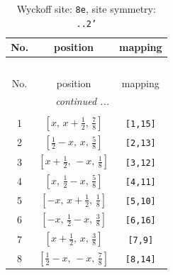 \documentclass[fleqn,8pt]{jsarticle}
\begin{document}
\begin{longtable}{ccc}
\caption{Wyckoff site: {\tt 8e}, site symmetry: {\tt ..2'}}
 \\
 \hline \hline
No. & position & mapping \\ \hline \endfirsthead

\multicolumn{2}{l}{\tablename\ \thetable{}} \\
 \hline \hline
No. & position & mapping \\ \hline \endhead

 \hline \hline
\multicolumn{2}{r}{\footnotesize\it continued ...} \\ \endfoot

 \hline \hline
\multicolumn{2}{r}{} \\ \endlastfoot

1 & $\left[ x,\, x + \frac{1}{2},\, \frac{7}{8} \right]$ & {\tt [1,15]} \\ \hline
2 & $\left[ \frac{1}{2} - x,\, x,\, \frac{5}{8} \right]$ & {\tt [2,13]} \\ \hline
3 & $\left[ x + \frac{1}{2},\, - x,\, \frac{1}{8} \right]$ & {\tt [3,12]} \\ \hline
4 & $\left[ x,\, \frac{1}{2} - x,\, \frac{5}{8} \right]$ & {\tt [4,11]} \\ \hline
5 & $\left[ - x,\, x + \frac{1}{2},\, \frac{1}{8} \right]$ & {\tt [5,10]} \\ \hline
6 & $\left[ - x,\, \frac{1}{2} - x,\, \frac{3}{8} \right]$ & {\tt [6,16]} \\ \hline
7 & $\left[ x + \frac{1}{2},\, x,\, \frac{3}{8} \right]$ & {\tt [7,9]} \\ \hline
8 & $\left[ \frac{1}{2} - x,\, - x,\, \frac{7}{8} \right]$ & {\tt [8,14]} \\
\end{longtable}
\renewcommand{\arraystretch}{1.2}
\end{document}

